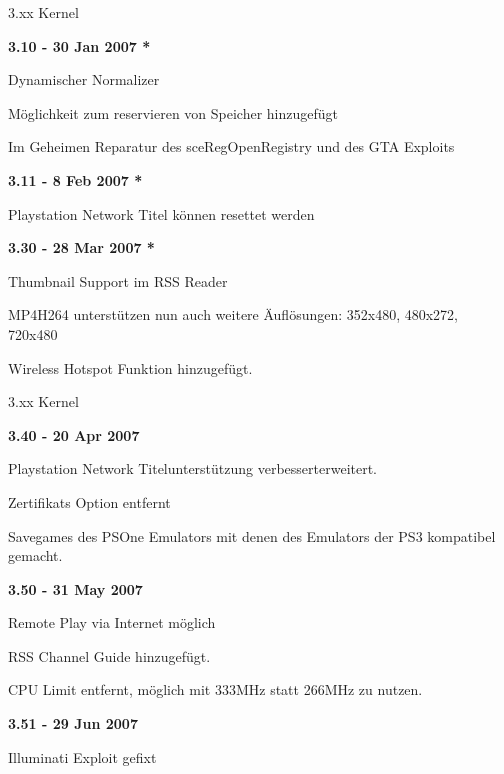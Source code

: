 \documentclass[mode=print,paper=screen,style=jefka]{powerdot}
\begin{document}
\begin{slide}{3.xx Kernel}
	\begin{large}\textbf{3.10 - 30 Jan 2007 *}\end{large}
	\begin{list}{-}{}
		\item{Dynamischer Normalizer}
		\item{Möglichkeit zum reservieren von Speicher hinzugefügt}
		\item{Im Geheimen Reparatur des sceRegOpenRegistry und des GTA Exploits}
	\end{list}
	\begin{large}\textbf{3.11 - 8 Feb 2007 *}\end{large}
	\begin{list}{-}{}
		\item{Playstation Network Titel können resettet werden}
	\end{list}
	\begin{large}\textbf{3.30 - 28 Mar 2007 *}\end{large}
	\begin{list}{-}{}
		\item{Thumbnail Support im RSS Reader}
		\item{MP4\/H264 unterstützen nun auch weitere Äuflösungen: 352x480, 480x272, 720x480}
		\item{Wireless Hotspot Funktion hinzugefügt.}
	\end{list}
\end{slide}

\begin{slide}{3.xx Kernel}
	\begin{large}\textbf{3.40 - 20 Apr 2007}\end{large}
	\begin{list}{-}{}
		\item{Playstation Network Titelunterstützung verbessert\/erweitert.}
		\item{Zertifikats Option entfernt}
		\item{Savegames des PSOne Emulators mit denen des Emulators der PS3 kompatibel gemacht.}
	\end{list}
	\begin{large}\textbf{3.50 - 31 May 2007}\end{large}
	\begin{list}{-}{}
		\item{Remote Play via Internet möglich}
		\item{RSS Channel Guide hinzugefügt.}
		\item{CPU Limit entfernt, möglich mit 333MHz statt 266MHz zu nutzen.}
	\end{list}
	\begin{large}\textbf{3.51 - 29 Jun 2007}\end{large}
	\begin{list}{-}{}
		\item{Illuminati Exploit gefixt}
	\end{list}
\end{slide}
\end{document}
